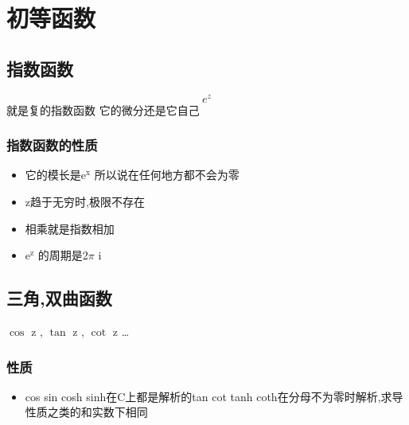 \documentclass[11pt]{article}
\begin{document}
\section{初等函数}
\label{sec:orge308c5b}
\subsection{指数函数}
\label{sec:orgb6a9ce2}
\[
e^z
\]
就是复的指数函数
它的微分还是它自己
\subsubsection{指数函数的性质}
\label{sec:org9eb87f5}
\begin{itemize}
\item 它的模长是e\(^{\text{x}}\) 所以说在任何地方都不会为零
\item z趋于无穷时,极限不存在
\item 相乘就是指数相加
\item e\(^{\text{z}}\) 的周期是2\(\pi\) i
\end{itemize}
\subsection{三角,双曲函数}
\label{sec:org6a64f6f}
\(\cos\) z , \(\tan\) z , \(\cot\) z \ldots{}
\subsubsection{性质}
\label{sec:org4c4ebd1}
\begin{itemize}
\item cos sin cosh sinh在C上都是解析的tan cot tanh coth在分母不为零时解析,求导性质之类的和实数下相同
\end{itemize}
\end{document}
